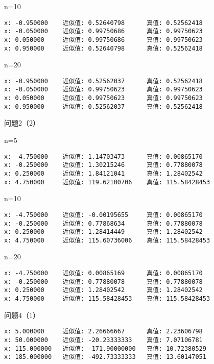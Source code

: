 \documentclass[a4paper,zihao=4,UTF8]{ctexart}
\begin{document}
n=10

\begin{lstlisting}
x: -0.950000    近似值: 0.52640798      真值: 0.52562418
x: -0.050000    近似值: 0.99750686      真值: 0.99750623
x: 0.050000     近似值: 0.99750686      真值: 0.99750623
x: 0.950000     近似值: 0.52640798      真值: 0.52562418
\end{lstlisting}

n=20

\begin{lstlisting}
x: -0.950000    近似值: 0.52562037      真值: 0.52562418
x: -0.050000    近似值: 0.99750623      真值: 0.99750623
x: 0.050000     近似值: 0.99750623      真值: 0.99750623
x: 0.950000     近似值: 0.52562037      真值: 0.52562418
\end{lstlisting}

问题2（2）

n=5

\begin{lstlisting}
x: -4.750000    近似值: 1.14703473      真值: 0.00865170
x: -0.250000    近似值: 1.30215246      真值: 0.77880078
x: 0.250000     近似值: 1.84121041      真值: 1.28402542
x: 4.750000     近似值: 119.62100706    真值: 115.58428453
\end{lstlisting}

n=10

\begin{lstlisting}
x: -4.750000    近似值: -0.00195655     真值: 0.00865170
x: -0.250000    近似值: 0.77868634      真值: 0.77880078
x: 0.250000     近似值: 1.28414449      真值: 1.28402542
x: 4.750000     近似值: 115.60736006    真值: 115.58428453
\end{lstlisting}

n=20

\begin{lstlisting}
x: -4.750000    近似值: 0.00865169      真值: 0.00865170
x: -0.250000    近似值: 0.77880078      真值: 0.77880078
x: 0.250000     近似值: 1.28402542      真值: 1.28402542
x: 4.750000     近似值: 115.58428453    真值: 115.58428453
\end{lstlisting}

问题4（1）

\begin{lstlisting}
x: 5.000000     近似值: 2.26666667      真值: 2.23606798
x: 50.000000    近似值: -20.23333333    真值: 7.07106781
x: 115.000000   近似值: -171.90000000   真值: 10.72380529
x: 185.000000   近似值: -492.73333333   真值: 13.60147051
\end{lstlisting}
\end{document}
